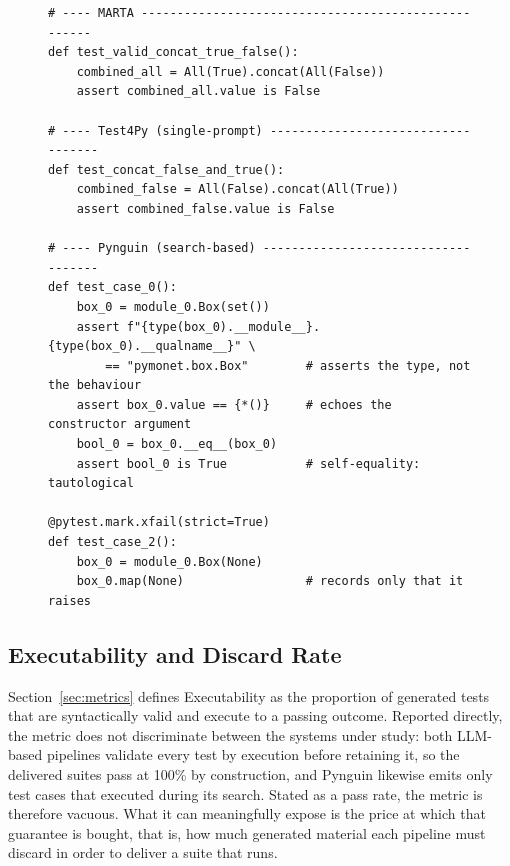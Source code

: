 \begin{figure}[htpb]
\centering
\begin{lstlisting}[basicstyle=\ttfamily\scriptsize, breaklines=true, frame=single, backgroundcolor=\color{gray!5}, caption={Tests generated for \texttt{pyMonet.semigroups.All.concat} by the three tools (16B model; excerpts). The LLM-driven pipelines assert on the computed value; the search-based generator asserts on type signatures and construction-time attributes, and marks failing paths with \texttt{xfail}.}, label={fig:oracles-example}]
# ---- MARTA ----------------------------------------------------
def test_valid_concat_true_false():
    combined_all = All(True).concat(All(False))
    assert combined_all.value is False

# ---- Test4Py (single-prompt) -----------------------------------
def test_concat_false_and_true():
    combined_false = All(False).concat(All(True))
    assert combined_false.value is False

# ---- Pynguin (search-based) ------------------------------------
def test_case_0():
    box_0 = module_0.Box(set())
    assert f"{type(box_0).__module__}.{type(box_0).__qualname__}" \
        == "pymonet.box.Box"        # asserts the type, not the behaviour
    assert box_0.value == {*()}     # echoes the constructor argument
    bool_0 = box_0.__eq__(box_0)
    assert bool_0 is True           # self-equality: tautological

@pytest.mark.xfail(strict=True)
def test_case_2():
    box_0 = module_0.Box(None)
    box_0.map(None)                 # records only that it raises
\end{lstlisting}
\end{figure}

\subsection{Executability and Discard Rate}
\label{sec:executability}

Section~\ref{sec:metrics} defines Executability as the proportion of generated tests
that are syntactically valid and execute to a passing outcome. Reported directly, the
metric does not discriminate between the systems under study: both LLM-based
pipelines validate every test by execution before retaining it, so the delivered
suites pass at 100\% by construction, and Pynguin likewise emits only test cases that
executed during its search. Stated as a pass rate, the metric is therefore vacuous.
What it can meaningfully expose is the price at which that guarantee is bought, that
is, how much generated material each pipeline must discard in order to deliver a
suite that runs.

